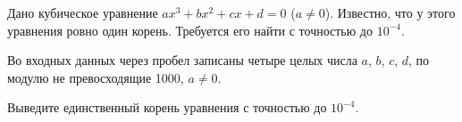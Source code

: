 
Дано кубическое уравнение $ax^3+bx^2+cx+d=0$ ($a\ne 0$). 
Известно, что у этого уравнения ровно один корень. Требуется его найти с точностью до $10^{-4}$.

\InputFile
Во входных данных через пробел записаны четыре целых числа $a$, $b$, $c$, $d$, 
по модулю не превосходящие 1000, $a\ne 0$.

\OutputFile
Выведите единственный корень уравнения с точностью  до $10^{-4}$.
